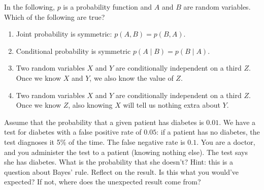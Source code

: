 \documentclass[11pt]{article}
\begin{document}
\qu In the following, $p$ is a  probability function and $A$ and $B$ are random variables. Which of the following are true?
\begin{enumerate}
	\item Joint probability is symmetric: $p(A, B) = p(B, A)$. 
	\item Conditional probability is symmetric $p(A \mid B) = p(B \mid A)$. 
	\item Two random variables $X$ and $Y$ are conditionally independent on a third $Z$. Once we know $X$ and $Y$, we also know the value of $Z$. 
	\item Two random variables $X$ and $Y$ are conditionally independent on a third $Z$. Once we know $Z$, also knowing $X$ will tell us nothing extra about $Y$. 
\end{enumerate}	

\qu Assume that the probability that a given patient has diabetes is $0.01$. We have a test for diabetes with a false positive rate of $0.05$: if a patient has no diabetes, the test diagnoses it 5\% of the time. The false negative rate is $0.1$. 
You are a doctor, and you administer the test to a patient (knowing nothing else). The test says she has diabetes. What is the probability that she doesn't? Hint: this is a question about Bayes' rule.
Reflect on the result. Is this what you would've expected? If not, where does the unexpected result come from?
\end{document}
